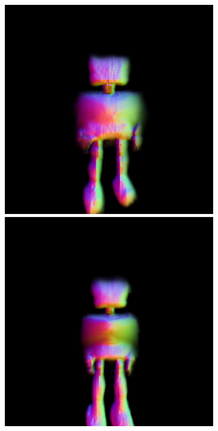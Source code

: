 \begin{figure}[ht]
\begin{subfigure}[b]{0.20\textwidth}
        \includegraphics[width=\textwidth]{etc/a robot made out of plants/dreamfusion/dreamfusion_plantrobot_5000_part2.png}
        \includegraphics[width=\textwidth]{etc/a robot made out of plants/dreamfusion/dreamfusion_plantrobot_10000_part2.png}

\end{subfigure}
\end{figure}

